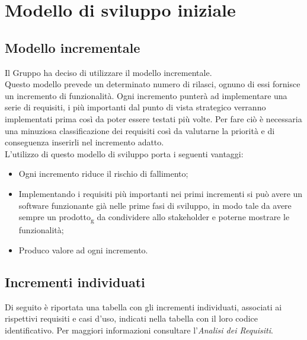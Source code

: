 \section{Modello di sviluppo iniziale}
\subsection{Modello incrementale}
Il Gruppo ha deciso di utilizzare il modello incrementale. \\
 Questo modello prevede un determinato numero di rilasci, ognuno di essi fornisce un incremento di funzionalità.
Ogni incremento punterà ad implementare una serie di requisiti,  i più importanti dal punto di vista strategico verranno implementati prima così da poter essere testati più volte.  Per fare ciò è necessaria una minuziosa classificazione dei requisiti così da valutarne la priorità e di conseguenza inserirli nel incremento adatto.\\
L'utilizzo di questo modello di sviluppo porta i seguenti vantaggi:
\begin{itemize}
\item Ogni incremento riduce il rischio di fallimento;
\item Implementando i requisiti più importanti nei primi incrementi si può avere un software funzionante già nelle prime fasi di sviluppo, in modo tale da avere sempre un prodotto\textsubscript{g} da condividere allo stakeholder e poterne mostrare le funzionalità;
\item  Produco valore ad ogni incremento.
\end{itemize}

\subsection{Incrementi individuati}
Di seguito è riportata una tabella con gli incrementi individuati, associati ai rispettivi requisiti 
e casi d'uso, indicati nella tabella con il loro codice identificativo. Per maggiori informazioni consultare
l'\textit{Analisi dei Requisiti}.


